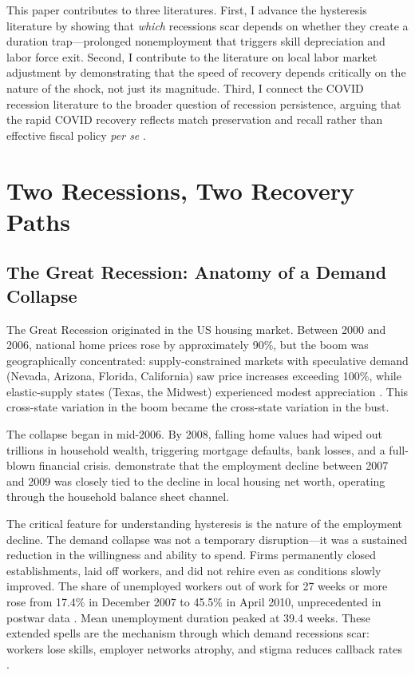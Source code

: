 \documentclass[12pt]{article}
\begin{document}
This paper contributes to three literatures. First, I advance the hysteresis literature \citep{blanchard1986hysteresis, cerra2008growth, cerra2023hysteresis} by showing that \textit{which} recessions scar depends on whether they create a duration trap---prolonged nonemployment that triggers skill depreciation and labor force exit. Second, I contribute to the literature on local labor market adjustment \citep{blanchard1992regional, autor2013china, yagan2019employment} by demonstrating that the speed of recovery depends critically on the nature of the shock, not just its magnitude. Third, I connect the COVID recession literature \citep{chetty2020real, cajner2020us, forsythe2022labor} to the broader question of recession persistence, arguing that the rapid COVID recovery reflects match preservation and recall rather than effective fiscal policy \textit{per se} \citep{autor2022paycheck}.


\section{Two Recessions, Two Recovery Paths}
\label{sec:background}

\subsection{The Great Recession: Anatomy of a Demand Collapse}

The Great Recession originated in the US housing market. Between 2000 and 2006, national home prices rose by approximately 90\%, but the boom was geographically concentrated: supply-constrained markets with speculative demand (Nevada, Arizona, Florida, California) saw price increases exceeding 100\%, while elastic-supply states (Texas, the Midwest) experienced modest appreciation \citep{mian2013household, saiz2010geographic}. This cross-state variation in the boom became the cross-state variation in the bust.

The collapse began in mid-2006. By 2008, falling home values had wiped out trillions in household wealth, triggering mortgage defaults, bank losses, and a full-blown financial crisis. \citet{mian2014explains} demonstrate that the employment decline between 2007 and 2009 was closely tied to the decline in local housing net worth, operating through the household balance sheet channel.

The critical feature for understanding hysteresis is the nature of the employment decline. The demand collapse was not a temporary disruption---it was a sustained reduction in the willingness and ability to spend. Firms permanently closed establishments, laid off workers, and did not rehire even as conditions slowly improved. The share of unemployed workers out of work for 27 weeks or more rose from 17.4\% in December 2007 to 45.5\% in April 2010, unprecedented in postwar data \citep{kroft2016long}. Mean unemployment duration peaked at 39.4 weeks. These extended spells are the mechanism through which demand recessions scar: workers lose skills, employer networks atrophy, and stigma reduces callback rates \citep{kroft2016long, elsby2010labor}.
\end{document}
